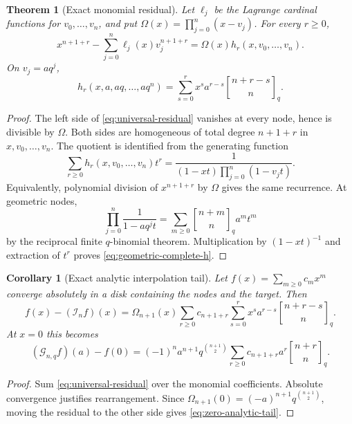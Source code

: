 \documentclass[11pt,a4paper,oneside]{article}
\newtheorem{theorem}{Theorem}[section]
\newtheorem{corollary}[corollary]{Corollary}
\theoremstyle{definition}
\theoremstyle{remark}
\newcommand{\Gop}{\mathcal G}
\newcommand{\Iop}{\mathcal I}
\newcommand{\qbinom}[3]{\genfrac{[}{]}{0pt}{}{#1}{#2}_{#3}}
\begin{document}
\begin{theorem}[Exact monomial residual]
\label{thm:universal-residual}
Let $\ell_j$ be the Lagrange cardinal functions for
$v_0,\ldots,v_n$, and put $\Omega(x)=\prod_{j=0}^n(x-v_j)$.  For every
$r\ge0$,
\begin{equation}
 x^{n+1+r}-\sum_{j=0}^n\ell_j(x)v_j^{n+1+r}
 =\Omega(x)h_r(x,v_0,\ldots,v_n).
 \label{eq:universal-residual}
\end{equation}
On $v_j=aq^j$,
\begin{equation}
 h_r(x,a,aq,\ldots,aq^n)
 =\sum_{s=0}^r x^s a^{r-s}\qbinom{n+r-s}{n}q.
 \label{eq:geometric-complete-h}
\end{equation}
\end{theorem}

\begin{proof}
The left side of \eqref{eq:universal-residual} vanishes at every node, hence is
divisible by $\Omega$.  Both sides are homogeneous of total degree $n+1+r$
in $x,v_0,\ldots,v_n$.  The quotient is identified from the generating
function
\[
 \sum_{r\ge0}h_r(x,v_0,\ldots,v_n)t^r
 =\frac1{(1-xt)\prod_{j=0}^n(1-v_jt)}.
\]
Equivalently, polynomial division of $x^{n+1+r}$ by $\Omega$ gives the same
recurrence.  At geometric nodes,
\[
 \prod_{j=0}^n\frac1{1-aq^jt}
 =\sum_{m\ge0}\qbinom{n+m}{n}q a^mt^m
\]
by the reciprocal finite $q$-binomial theorem.  Multiplication by
$(1-xt)^{-1}$ and extraction of $t^r$ proves
\eqref{eq:geometric-complete-h}.
\end{proof}

\begin{corollary}[Exact analytic interpolation tail]
\label{cor:analytic-residual}
Let $f(x)=\sum_{m\ge0}c_mx^m$ converge absolutely in a disk containing the
nodes and the target.  Then
\begin{equation}
 f(x)-(\Iop_nf)(x)
 =\Omega_{n+1}(x)
 \sum_{r\ge0}c_{n+1+r}
 \sum_{s=0}^r x^sa^{r-s}\qbinom{n+r-s}{n}q.
 \label{eq:analytic-residual}
\end{equation}
At $x=0$ this becomes
\begin{equation}
 (\Gop_{n,q}f)(a)-f(0)
 =(-1)^n a^{n+1}q^{\binom{n+1}{2}}
 \sum_{r\ge0}c_{n+1+r}a^r\qbinom{n+r}{n}q.
 \label{eq:zero-analytic-tail}
\end{equation}
\end{corollary}

\begin{proof}
Sum \eqref{eq:universal-residual} over the monomial coefficients.  Absolute
convergence justifies rearrangement.  Since
$\Omega_{n+1}(0)=(-a)^{n+1}q^{\binom{n+1}{2}}$, moving the residual to the
other side gives \eqref{eq:zero-analytic-tail}.
\end{proof}
\end{document}
